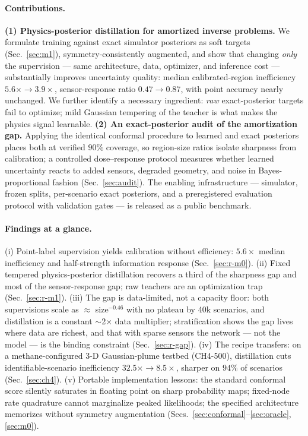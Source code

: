 \documentclass{article}
\begin{document}
\paragraph{Contributions.}
\textbf{(1) Physics-posterior distillation for amortized inverse problems.} We formulate
training against exact simulator posteriors as soft targets (Sec.~\ref{sec:m1}),
symmetry-consistently augmented, and show that changing \emph{only} the supervision ---
same architecture, data, optimizer, and inference cost --- substantially improves
uncertainty quality: median calibrated-region inefficiency $5.6\times \to 3.9\times$,
sensor-response ratio $0.47 \to 0.87$, with point accuracy nearly unchanged. We further
identify a necessary ingredient: \emph{raw} exact-posterior targets fail to optimize;
mild Gaussian tempering of the teacher is what makes the physics signal learnable.
\textbf{(2) An exact-posterior audit of the amortization gap.} Applying the identical
conformal procedure to learned and exact posteriors places both at verified $90\%$
coverage, so region-size ratios isolate sharpness from calibration; a controlled
dose--response protocol measures whether learned uncertainty reacts to added sensors,
degraded geometry, and noise in Bayes-proportional fashion (Sec.~\ref{sec:audit}). The
enabling infrastructure --- simulator, frozen splits, per-scenario exact posteriors, and a
preregistered evaluation protocol with validation gates --- is released as a public
benchmark.

\paragraph{Findings at a glance.}
(i) Point-label supervision yields calibration without efficiency: $5.6\times$ median
inefficiency and half-strength information response (Sec.~\ref{sec:r-m0}).
(ii) Fixed tempered physics-posterior distillation recovers a third of the sharpness gap
and most of the sensor-response gap; raw teachers are an optimization trap
(Sec.~\ref{sec:r-m1}).
(iii) The gap is data-limited, not a capacity floor: both supervisions scale as
$\approx$ size$^{-0.46}$ with no plateau by 40k scenarios, and distillation is a
constant $\sim$2$\times$ data multiplier; stratification shows the gap lives where data
are richest, and that with sparse sensors the network --- not the model --- is the
binding constraint (Sec.~\ref{sec:r-gap}).
(iv) The recipe transfers: on a methane-configured 3-D Gaussian-plume testbed
(CH4-500), distillation cuts identifiable-scenario inefficiency $32.5\times \to
8.5\times$, sharper on $94\%$ of scenarios (Sec.~\ref{sec:ch4}).
(v) Portable implementation lessons: the standard conformal score silently saturates in
floating point on sharp probability maps; fixed-node rate quadrature cannot marginalize
peaked likelihoods; the specified architecture memorizes without symmetry augmentation
(Secs.~\ref{sec:conformal}--\ref{sec:oracle}, \ref{sec:m0}).
\end{document}
